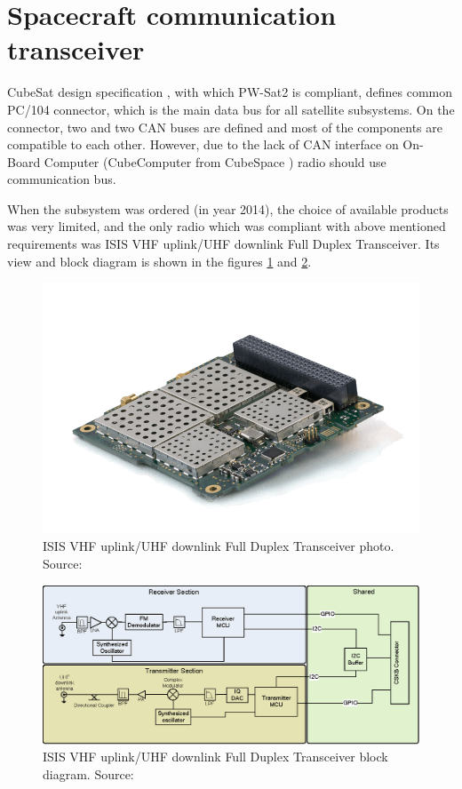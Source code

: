 \section{Spacecraft communication transceiver}
\label{section:comm_design}
CubeSat design specification \cite{cubesat_spec}, with which PW-Sat2 is compliant, defines common PC/104 connector, which is the main data bus for all satellite subsystems. On the connector, two \iic and two CAN buses are defined and most of the components are compatible to each other. However, due to the lack of CAN interface on On-Board Computer (CubeComputer from CubeSpace \cite{cubespace_website}) radio should use \iic communication bus.

When the subsystem was ordered (in year \si{2014}), the choice of available products was very limited, and the only radio which was compliant with above mentioned requirements was ISIS VHF uplink/UHF downlink Full Duplex Transceiver. Its view and block diagram is shown in the figures \ref{ISIS_TRXvU_photo} and \ref{ISIS_TRXvU_block_diagram}.

\begin{figure}
    \centering
    \includegraphics[width=0.5\paperwidth]{img/6/ISIS-radio-UHF-VHF-min.png}
    \caption{ISIS VHF uplink/UHF downlink Full Duplex Transceiver photo. Source: \cite{isis_trxvu}}
    \label{ISIS_TRXvU_photo}
\end{figure}

\begin{figure}
    \centering
    \includegraphics[width=0.8\paperwidth]{img/6/ISIS_TRXvU_block_diagram.eps}
    \caption{ISIS VHF uplink/UHF downlink Full Duplex Transceiver block diagram. Source: \cite{isis_trxvu}}
    \label{ISIS_TRXvU_block_diagram}
\end{figure}

